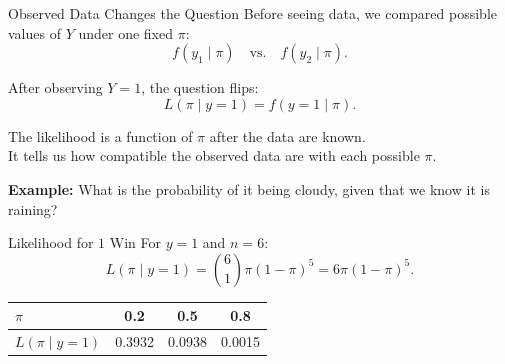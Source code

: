 \documentclass[12pt]{beamer}
\begin{document}
\begin{frame}{}
\begin{block}{Observed Data Changes the Question}
\small
Before seeing data, we compared possible values of $Y$ under one fixed $\pi$:
\[
f(y_1\mid\pi) \quad \text{vs.} \quad f(y_2\mid\pi).
\]

After observing $Y=1$, the question flips:
\[
L(\pi\mid y=1)=f(y=1\mid\pi).
\]

The likelihood is a function of $\pi$ after the data are known.\\
It tells us how compatible the observed data are with each possible $\pi$.
\end{block}

\begin{block}{}
\textcolor{aggiemaroon!70}{
\textbf{Example:}
What is the probability of it being cloudy, given that we know it is raining?
}
\end{block}
\end{frame}

\begin{frame}{}
\begin{block}{Likelihood for $1$ Win}
\small
For $y=1$ and $n=6$:
\[
L(\pi\mid y=1)=\binom{6}{1}\pi(1-\pi)^5=6\pi(1-\pi)^5.
\]

\begin{center}
\begin{tabular}{lccc}
\toprule
$\pi$ & 0.2 & 0.5 & 0.8 \\
\midrule
$L(\pi\mid y=1)$ & 0.3932 & 0.0938 & 0.0015 \\
\bottomrule
\end{tabular}
\end{center}

\begin{center}
\footnotesize
{}
\end{center}
\end{block}
\end{frame}
\end{document}
